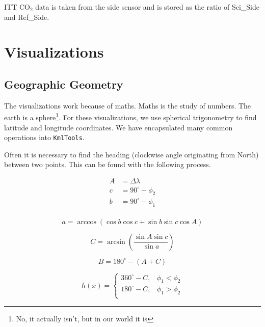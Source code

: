 \documentclass[12pt]{article}
\begin{document}
ITT CO$_2$ data is taken from the side sensor and is stored as the ratio of Sci\_Side and Ref\_Side.  

\section*{Visualizations}

\subsection*{Geographic Geometry}

The visualizations work because of maths.  Maths is the study of numbers.  The earth is a sphere\footnote{No, it actually isn't, but in our world it is}.  For these visualizations, we use spherical trigonometry to find latitude and longitude coordinates.  We have encapsulated many common operations into \texttt{KmlTools}.

Often it is necessary to find the heading (clockwise angle originating from North) between two points.  This can be found with the following process.

\begin{equation}
\begin{aligned}
A &=\Delta \lambda \\
c &=90^\circ - \phi_2 \\
b &=90^\circ - \phi_1 \\
\end{aligned}
\end{equation}

\begin{equation}
a = \arccos{(\cos{b}\cos{c} + \sin{b}\sin{c}\cos{A})}
\end{equation}

\begin{equation}
C =\arcsin{\left( \frac{\sin{A}\sin{c}}{\sin{a}} \right)}
\end{equation}

\begin{equation}
B = 180^\circ - (A + C)
\end{equation}

\begin{equation}
h(x) = \begin{cases}
  360^\circ - C, & \phi_1<\phi_2 \\
  180^\circ - C, & \phi_1>\phi_2 \\
\end{cases}
\end{equation}
\end{document}
